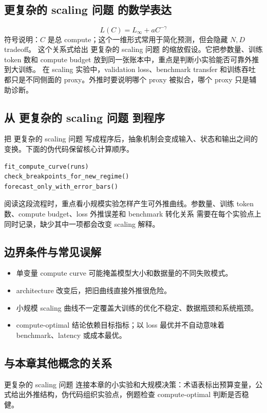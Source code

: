 \documentclass[a4paper]{article}
\begin{document}
\subsection{更复杂的 scaling 问题 的数学表达}
\[L(C)=L_\infty + aC^{-\gamma}\]
符号说明：\(C\) 是总 compute；这个一维形式常用于简化预测，但会隐藏 \(N,D\) tradeoff。
这个关系式给出 更复杂的 scaling 问题 的缩放假设。它把参数量、训练 token 数和 compute budget 放到同一张账本中，重点是判断小实验能否可靠外推到大训练。
在 scaling 实验中，validation loss、benchmark transfer 和训练吞吐都只是不同侧面的 proxy。外推时要说明哪个 proxy 被拟合，哪个 proxy 只是辅助诊断。
\subsection{从 更复杂的 scaling 问题 到程序}
把 更复杂的 scaling 问题 写成程序后，抽象机制会变成输入、状态和输出之间的变换。下面的伪代码保留核心计算顺序。
\begin{lstlisting}[language=Python]
fit_compute_curve(runs)
check_breakpoints_for_new_regime()
forecast_only_with_error_bars()
\end{lstlisting}
阅读这段流程时，重点看小规模实验怎样产生可外推曲线。参数量、训练 token 数、compute budget、loss 外推误差和 benchmark 转化关系 需要在每个实验点上同时记录，缺少其中一项都会改变 scaling 解释。
\subsection{边界条件与常见误解}
\begin{itemize}
\item 单变量 compute curve 可能掩盖模型大小和数据量的不同失败模式。
\item architecture 改变后，把旧曲线直接外推很危险。
\item 小规模 scaling 曲线不一定覆盖大训练的优化不稳定、数据瓶颈和系统瓶颈。
\item compute-optimal 结论依赖目标指标；以 loss 最优并不自动意味着 benchmark、latency 或成本最优。
\end{itemize}
\subsection{与本章其他概念的关系}
更复杂的 scaling 问题 连接本章的小实验和大规模决策：术语表标出预算变量，公式给出外推结构，伪代码组织实验点，例题检查 compute-optimal 判断是否稳健。
\end{document}
